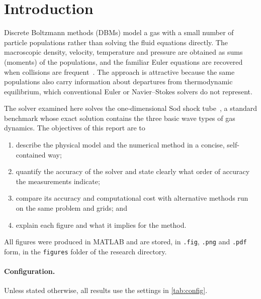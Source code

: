 \documentclass[11pt]{article}
\begin{document}
\section{Introduction}

Discrete Boltzmann methods (DBMs) model a gas with a small number of particle
populations rather than solving the fluid equations directly.  The macroscopic
density, velocity, temperature and pressure are obtained as sums (moments) of the
populations, and the familiar Euler equations are recovered when collisions are
frequent~\citep{KataokaTsutahara2004Euler,XuZhangZhang2018}.  The approach is attractive
because the same populations also carry information about departures from
thermodynamic equilibrium, which conventional Euler or Navier--Stokes solvers do not
represent.

The solver examined here solves the one-dimensional Sod shock tube~\citep{Sod1978}, a
standard benchmark whose exact solution contains the three basic wave types of gas
dynamics.  The objectives of this report are to
\begin{enumerate}
  \item describe the physical model and the numerical method in a concise, self-contained way;
  \item quantify the accuracy of the solver and state clearly what order of accuracy the
        measurements indicate;
  \item compare its accuracy and computational cost with alternative methods run on the
        same problem and grids; and
  \item explain each figure and what it implies for the method.
\end{enumerate}
All figures were produced in MATLAB and are stored, in \texttt{.fig}, \texttt{.png} and
\texttt{.pdf} form, in the \texttt{figures} folder of the research directory.

\paragraph{Configuration.}  Unless stated otherwise, all results use the settings in
\cref{tab:config}.
\end{document}
